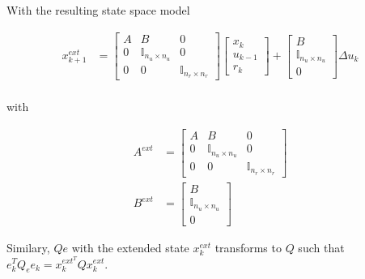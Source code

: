 \documentclass{article}
\begin{document}
With the resulting state space model

\begin{equation}
  \begin{aligned}
    x_{k+1}^{ext} &=
    \begin{bmatrix}
      A & B & 0 \\
      0 & \mathbb{I}_{n_u \times n_u} & 0 \\
      0 & 0 & \mathbb{I}_{n_r \times n_r}
    \end{bmatrix}
    \begin{bmatrix}
      x_k \\
      u_{k-1} \\
      r_k
    \end{bmatrix} +
    \begin{bmatrix}
      B \\
      \mathbb{I}_{n_u \times n_u} \\
      0
    \end{bmatrix} \Delta u_k \\
  \end{aligned}
\end{equation}

with

$$
\begin{aligned}
  A^{ext} &=
  \begin{bmatrix}
    A & B & 0 \\
    0 & \mathbb{I}_{n_u \times n_u} & 0 \\
    0 & 0 & \mathbb{I}_{n_r \times n_r}
  \end{bmatrix} \\
  B^{ext} &=
  \begin{bmatrix}
    B \\
    \mathbb{I}_{n_u \times n_u} \\
    0
  \end{bmatrix}
\end{aligned}
$$

Similary, $Qe$ with the extended state $x_k^{ext}$ transforms to $Q$ such that $e_k^T Q_e e_k = x_k^{ext^T} Q x_k^{ext}$.
\end{document}
